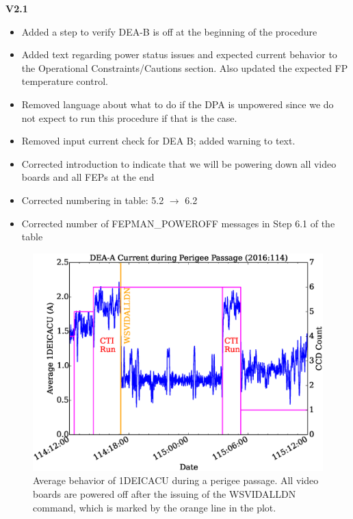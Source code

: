 \documentclass[11pt]{article}
\begin{document}
{\bf V2.1}
\begin{itemize}
\item Added a step to verify DEA-B is off at the beginning of the procedure
\item Added text regarding power status issues and expected current behavior to the Operational Constraints/Cautions section. Also updated the expected FP temperature control.
\item Removed language about what to do if the DPA is unpowered since we do not expect to run this procedure if that is the case.
\item Removed input current check for DEA B; added warning to text.
\item Corrected introduction to indicate that we will be powering down all video boards and all FEPs at the end
\item Corrected numbering in table: 5.2 $\rightarrow$ 6.2
\item Corrected number of FEPMAN\_POWEROFF messages in Step 6.1 of the table
\end{itemize}

\begin{landscape}
\begin{figure}
\begin{center}
\includegraphics[width=1.2\textwidth]{deaa_on_test_vid_fig1.eps}
\caption{Average behavior of 1DEICACU during a perigee passage. All video boards
are powered off after the issuing of the WSVIDALLDN command, which is marked by
the orange line in the plot.}
\end{center}
\end{figure}
\end{landscape}
\end{document}
